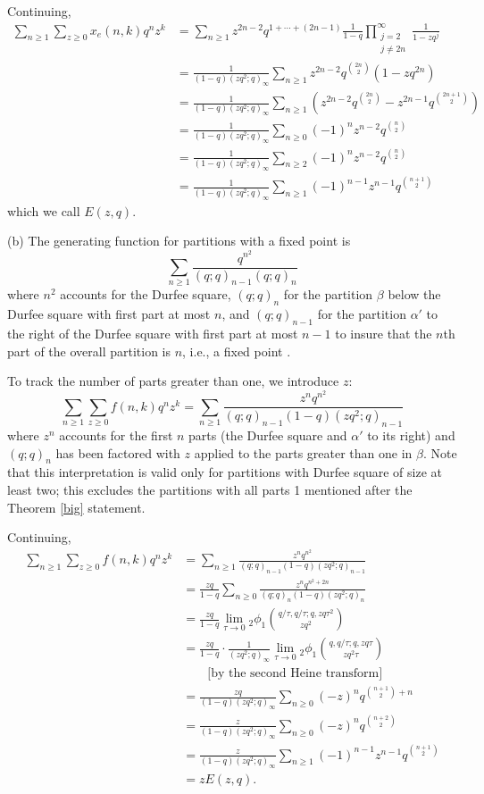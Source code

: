 \documentclass{amsart}
\theoremstyle{theorem}
\theoremstyle{definition}
\begin{document}
Continuing,
\begin{align*}
\sum_{n \ge 1} \sum_{z \ge 0} x_e(n,k) q^n z^k & = \sum_{n \ge 1}z^{2n-2} q^{1+\cdots+(2n-1)} \frac{1}{1-q} \prod_{\substack{j = 2 \\ j \ne 2n}}^\infty \frac{1}{1-zq^j} \\
& = \frac{1}{(1-q)(zq^2;q)_\infty} \sum_{n \ge 1} z^{2n-2} q^{\binom{2n}{2}} (1-z q^{2n}) \\
& = \frac{1}{(1-q)(zq^2;q)_\infty} \sum_{n \ge 1} \left(z^{2n-2} q^{\binom{2n}{2}} - z^{2n-1} q^{\binom{2n+1}{2}} \right) \\
& = \frac{1}{(1-q)(zq^2;q)_\infty} \sum_{n \ge 0} (-1)^n z^{n-2} q^{\binom{n}{2}} \\
& = \frac{1}{(1-q)(zq^2;q)_\infty} \sum_{n \ge 2} (-1)^n z^{n-2} q^{\binom{n}{2}} \\
& = \frac{1}{(1-q)(zq^2;q)_\infty} \sum_{n \ge 1} (-1)^{n-1} z^{n-1} q^{\binom{n+1}{2}}
\end{align*}
which we call $E(z,q)$.

(b) The generating function for partitions with a fixed point is
\[ \sum_{n \ge 1} \frac{q^{n^2}}{(q;q)_{n-1} (q;q)_n}\]
where $n^2$ accounts for the Durfee square, $(q;q)_n$ for the partition $\beta$ below the Durfee square with first part at most $n$, and $(q;q)_{n-1}$ for the partition $\alpha'$ to the right of the Durfee square with first part at most $n-1$ to insure that the $n$th part of the overall partition is $n$, i.e., a fixed point \cite{hs24}.

To track the number of parts greater than one, we introduce $z$:
\[ \sum_{n \ge 1} \sum_{z \ge 0} f(n,k) q^n z^k = \sum_{n \ge 1} \frac{z^n q^{n^2}}{(q;q)_{n-1} (1-q)(zq^2;q)_{n-1}} \]
where $z^n$ accounts for the first $n$ parts (the Durfee square and $\alpha'$ to its right) and $(q;q)_n$ has been factored with $z$ applied to the parts greater than one in $\beta$.  Note that this interpretation is valid only for partitions with Durfee square of size at least two; this excludes the partitions with all parts 1 mentioned after the Theorem \ref{big} statement.

Continuing,
\begin{align*}
\sum_{n \ge 1} \sum_{z \ge 0} f(n,k) q^n z^k & = \sum_{n \ge 1} \frac{z^n q^{n^2}}{(q;q)_{n-1} (1-q)(zq^2;q)_{n-1}}  \\
& = \frac{zq}{1-q} \sum_{n \ge 0} \frac{z^n q^{n^2+2n}}{(q;q)_n (1-q)(zq^2;q)_n}  \\
& = \frac{zq}{1-q} \lim_{\tau \to 0} {}_2\phi_1\binom{q/\tau, q/\tau; q, zq\tau^2}{zq^2} \\
& = \frac{zq}{1-q} \cdot \frac{1}{(zq^2;q)_\infty} \lim_{\tau \to 0} {}_2\phi_1\binom{q, q/\tau; q, zq\tau}{zq^2\tau} \\
& \qquad \text{[by the second Heine transform]} \\
& = \frac{zq}{(1-q)(zq^2;q)_\infty} \sum_{n \ge 0} (-z)^n q^{\binom{n+1}{2}+n} \\
& = \frac{z}{(1-q)(zq^2;q)_\infty} \sum_{n \ge 0} (-z)^n q^{\binom{n+2}{2}} \\
& = \frac{z}{(1-q)(zq^2;q)_\infty} \sum_{n \ge 1} (-1)^{n-1} z^{n-1} q^{\binom{n+1}{2}} \\
& = z E(z,q).
\end{align*}
\end{document}
